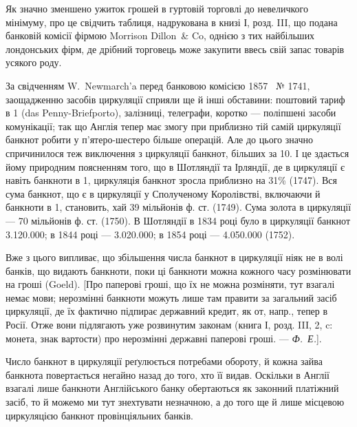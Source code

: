 
Як значно зменшено ужиток грошей в гуртовій торговлі до невеличкого
мінімуму, про це свідчить таблиця, надрукована в книзі І, розд. III,
що подана банковій комісії фірмою Morrison Dillon~\& Co, однією з тих найбільших
лондонських фірм, де дрібний торговець може закупити ввесь свій запас
товарів усякого роду.

За свідченням W.~Newmarch’a перед банковою комісією 1857~ № 1741,
заощадженню засобів циркуляції сприяли ще й інші обставини: поштовий тариф
в 1 (das Penny-Briefporto), залізниці, телеграфи, коротко — поліпшені засоби
комунікації; так що Англія тепер має змогу при приблизно тій самій циркуляції
банкнот робити у п’ятеро-шестеро більше операцій. Але до цього значно
спричинилося теж виключення з циркуляції банкнот, більших за 10. І це
здається йому природним поясненням того, що в Шотляндії та Ірляндії, де в
циркуляції є навіть банкноти в 1, циркуляція банкнот зросла приблизно
на 31\% (1747). Вся сума банкнот, що є в циркуляції у Сполученому Королівстві,
включаючи й банкноти в 1, становить, хай 39 мільйонів ф. ст.
(1749). Сума золота в циркуляції — 70 мільйонів ф. ст. (1750). В Шотляндії
в 1834 році було в циркуляції банкнот \num{3.120.000}; в 1844 році —
\num{3.020.000}; в 1854 році — \num{4.050.000} (1752).

Вже з цього випливає, що збільшення числа банкнот в циркуляції ніяк
не в волі банків, що видають банкноти, поки ці банкноти можна кожного часу
розмінювати на гроші (Goeld). [Про паперові гроші, що їх не можна розміняти,
тут взагалі немає мови; нерозмінні банкноти можуть лише там правити за загальний
засіб циркуляції, де їх фактично підпирає державний кредит, як от, напр., тепер
в Росії. Отже вони підлягають уже розвинутим законам (книга І, розд. III, 2, c:
монета, знак вартости) про нерозмінні державні паперові гроші. — \emph{Ф.~Е.}].

Число банкнот в циркуляції реґулюється потребами обороту, й кожна
зайва банкнота повертається негайно назад до того, хто її видав. Оскільки в
Англії взагалі лише банкноти Англійського банку обертаються як законний
платіжний засіб, то й можемо ми тут знехтувати незначною, а до того ще й лише
місцевою циркуляцією банкнот провінціяльних банків.

